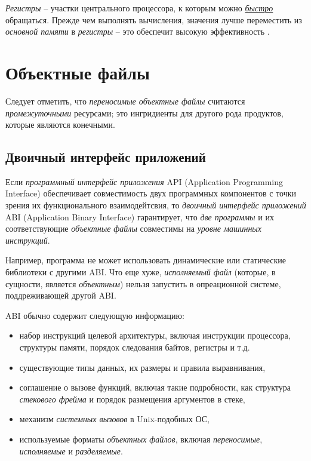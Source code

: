 \documentclass[%
	11pt,
	a4paper,
	utf8,
		]{article}
\begin{document}
\emph{Регистры} -- участки центрального процессора, к которым можно \underline{\itshape быстро} обращаться. Прежде чем выполнять вычисления, значения лучше переместить из \emph{основной памяти} в \emph{регистры} -- это обеспечит высокую эффективность \cite[]{amini-extreme-c:2022}.

\section{Объектные файлы}

Следует отметить, что \emph{переносимые объектные файлы} считаются \emph{промежуточными} ресурсами; это ингридиенты для другого рода продуктов, которые являются конечными.

\subsection{Двоичный интерфейс приложений}

Если \emph{программный интерфейс приложения} API (Application Programming Interface) обеспечивает совместимость двух программных компонентов с точки зрения их функционального взаимодейтсвия, то \emph{двоичный интерфейс приложений} ABI (Application Binary Interface) гарантирует, что \emph{две программы} и их соответствующие \emph{объектные файлы} совместимы на \emph{уровне машинных инструкций}.

Например, программа не может использовать динамические или статические библиотеки с другими ABI. Что еще хуже, \emph{исполняемый файл} (которые, в сущности, является \emph{объектным}) нельзя запустить в опреационной системе, поддреживающей другой ABI.

ABI обычно содержит следующую информацию:
\begin{itemize}
	\item набор инструкций целевой архитектуры, включая инструкции процессора, структуры памяти, порядок следования байтов, регистры и т.д.
	
	\item существующие типы данных, их размеры и правила выравнивания,
	
	\item соглашение о вызове функций, включая такие подробности, как структура \emph{стекового фрейма} и порядок размещения аргументов в стеке,
	
	\item механизм \emph{системных вызовов} в Unix-подобных ОС,
	
	\item используемые форматы \emph{объектных файлов}, включая \emph{переносимые}, \emph{исполняемые} и \emph{разделяемые}.
\end{itemize}
\end{document}
